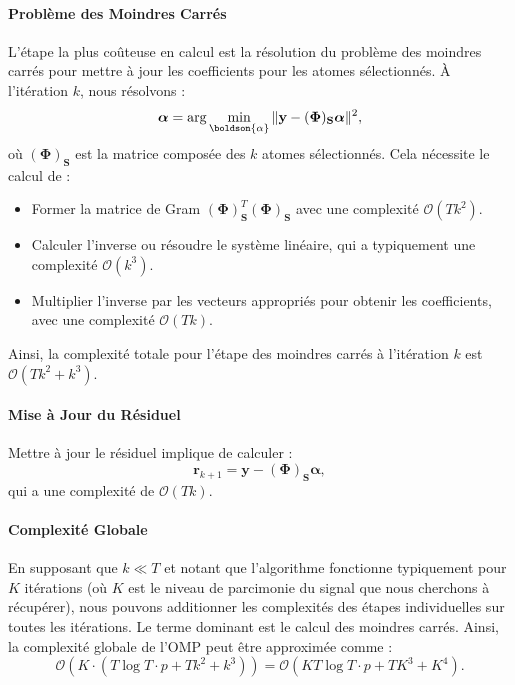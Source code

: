 \documentclass[9pt,a4paper,twoside]{rho}
\begin{document}
\paragraph{Problème des Moindres Carrés}
L'étape la plus coûteuse en calcul est la résolution du problème des moindres carrés pour mettre à jour les coefficients pour les atomes sélectionnés. À l'itération $k$, nous résolvons :
\begin{equation}
    \boldsymbol{\alpha} = \arg \min_{\boldson{\alpha}} \|\mathbf{y} - (\boldsymbol{\Phi})_{\mathbf{S}} \boldsymbol{\alpha}\|^2,
\end{equation}
où $(\boldsymbol{\Phi})_{\mathbf{S}}$ est la matrice composée des $k$ atomes sélectionnés. Cela nécessite le calcul de :
\begin{itemize}
    \item Former la matrice de Gram $(\boldsymbol{\Phi})_{\mathbf{S}}^T (\boldsymbol{\Phi})_{\mathbf{S}}$ avec une complexité $\mathcal{O}(Tk^2)$.
    \item Calculer l'inverse ou résoudre le système linéaire, qui a typiquement une complexité $\mathcal{O}(k^3)$.
    \item Multiplier l'inverse par les vecteurs appropriés pour obtenir les coefficients, avec une complexité $\mathcal{O}(Tk)$.
\end{itemize}
Ainsi, la complexité totale pour l'étape des moindres carrés à l'itération $k$ est $\mathcal{O}(Tk^2 + k^3)$.

\paragraph{Mise à Jour du Résiduel}
Mettre à jour le résiduel implique de calculer :
\begin{equation}
    \mathbf{r}_{k+1} = \mathbf{y} - (\boldsymbol{\Phi})_{\mathbf{S}} \boldsymbol{\alpha},
\end{equation}
qui a une complexité de $\mathcal{O}(Tk)$.

\paragraph{Complexité Globale}
En supposant que $k \ll T$ et notant que l'algorithme fonctionne typiquement pour $K$ itérations (où $K$ est le niveau de parcimonie du signal que nous cherchons à récupérer), nous pouvons additionner les complexités des étapes individuelles sur toutes les itérations. Le terme dominant est le calcul des moindres carrés. Ainsi, la complexité globale de l'OMP peut être approximée comme :
\begin{equation}
    \mathcal{O}(K \cdot (T \log T \cdot p + Tk^2 + k^3)) = \mathcal{O}(KT \log T \cdot p + TK^3 + K^4).
\end{equation}
\end{document}
